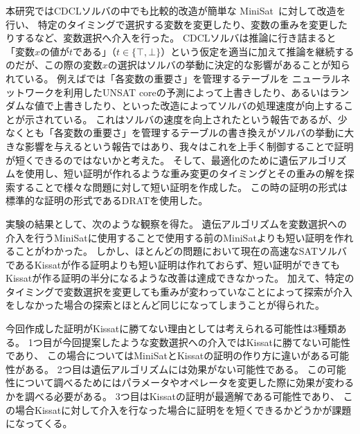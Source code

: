 

本研究ではCDCLソルバの中でも比較的改造が簡単な MiniSat~\cite{MINISAT}に対して改造を行い、
特定のタイミングで選択する変数を変更したり、変数の重みを変更したりするなど、変数選択へ介入を行った。
CDCLソルバは推論に行き詰まると「変数\( x \)の値が\( t \)である」（\( t \in \{ \top, \bot \} \)）という仮定を適当に加えて推論を継続するのだが、この際の変数\( x \)の選択はソルバの挙動に決定的な影響があることが知られている。
例えば\cite{neuralnet-vs-random-VSIDS}では「各変数の重要さ」を管理するテーブルを
ニューラルネットワークを利用したUNSAT coreの予測によって上書きしたり、あるいはランダムな値で上書きしたり、といった改造によってソルバの処理速度が向上することが示されている。
これはソルバの速度を向上されたという報告であるが、少なくとも「各変数の重要さ」を管理するテーブルの書き換えがソルバの挙動に大きな影響を与えるという報告ではあり、我々はこれを上手く制御することで証明が短くできるのではないかと考えた。
そして、最適化のために遺伝アルゴリズム\cite{GA}を使用し、短い証明が作れるような重み変更のタイミングとその重みの解を探索することで様々な問題に対して短い証明を作成した。
この時の証明の形式は標準的な証明の形式であるDRAT\cite{DRAT}を使用した。

実験の結果として、次のような観察を得た。
遺伝アルゴリズムを変数選択への介入を行うMiniSatに使用することで使用する前のMiniSatよりも短い証明を作れることがわかった。
しかし、ほとんどの問題において現在の高速なSATソルバであるKissatが作る証明よりも短い証明は作れておらず、短い証明ができてもKissatが作る証明の半分になるような改善は達成できなかった。
加えて、特定のタイミングで変数選択を変更しても重みが変わっていなことによって探索が介入をしなかった場合の探索とほとんど同じになってしまうことが得られた。

今回作成した証明がKissatに勝てない理由としては考えられる可能性は3種類ある。
1つ目が今回提案したような変数選択への介入ではKissatに勝てない可能性であり、
この場合についてはMiniSatとKissatの証明の作り方に違いがある可能性がある。
2つ目は遺伝アルゴリズムには効果がない可能性である。
この可能性について調べるためにはパラメータやオペレータを変更した際に効果が変わるかを調べる必要がある。
3つ目はKissatの証明が最適解である可能性であり、
この場合Kissatに対して介入を行なった場合に証明をを短くできるかどうかが課題になってくる。